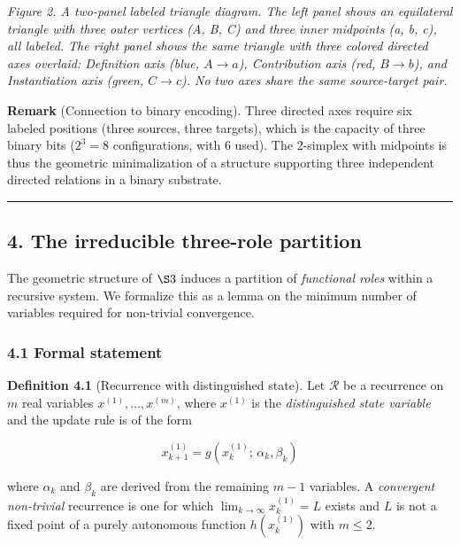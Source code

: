 \documentclass[
  11pt,
  letterpaper,
]{article}
\begin{document}
\emph{Figure 2. A two-panel labeled triangle diagram. The left panel
shows an equilateral triangle with three outer vertices (A, B, C) and
three inner midpoints (a, b, c), all labeled. The right panel shows the
same triangle with three colored directed axes overlaid: Definition axis
(blue, \(A \to a\)), Contribution axis (red, \(B \to b\)), and
Instantiation axis (green, \(C \to c\)). No two axes share the same
source-target pair.}

\textbf{Remark} (Connection to binary encoding). Three directed axes
require six labeled positions (three sources, three targets), which is
the capacity of three binary bits (\(2^3 = 8\) configurations, with 6
used). The 2-simplex with midpoints is thus the geometric minimalization
of a structure supporting three independent directed relations in a
binary substrate.

\begin{center}\rule{0.5\linewidth}{0.5pt}\end{center}

\subsection{4. The irreducible three-role
partition}\label{the-irreducible-three-role-partition}

The geometric structure of \(\S 3\) induces a partition of
\emph{functional roles} within a recursive system. We formalize this as
a lemma on the minimum number of variables required for non-trivial
convergence.

\subsubsection{4.1 Formal statement}\label{formal-statement}

\textbf{Definition 4.1} (Recurrence with distinguished state). Let
\(\mathcal{R}\) be a recurrence on \(m\) real variables
\(x^{(1)}, \ldots, x^{(m)}\), where \(x^{(1)}\) is the
\emph{distinguished state variable} and the update rule is of the form

\[x^{(1)}_{k+1} = g\!\left(x^{(1)}_k;\, \alpha_k, \beta_k\right)\]

where \(\alpha_k\) and \(\beta_k\) are derived from the remaining
\(m-1\) variables. A \emph{convergent non-trivial} recurrence is one for
which \(\lim_{k \to \infty} x^{(1)}_k = L\) exists and \(L\) is not a
fixed point of a purely autonomous function \(h(x^{(1)}_k)\) with
\(m \le 2\).
\end{document}
